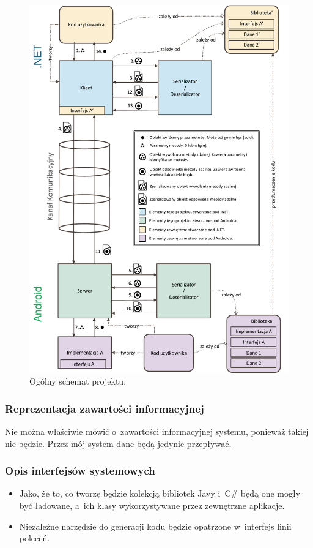\begin{figure}
	\centering
		\includegraphics[scale=0.8]{img/schematy/schemat-dzialania-magisterki.pdf}
	\caption{Ogólny schemat projektu.}
	\label{fig:project-overview}
\end{figure}


\subsubsection{Reprezentacja zawartości informacyjnej}
Nie można właściwie mówić o~zawartości informacyjnej systemu, ponieważ takiej nie będzie.
Przez mój system dane będą jedynie przepływać.


\subsubsection{Opis interfejsów systemowych}
\begin{itemize}
	\item Jako, że to, co tworzę będzie kolekcją bibliotek Javy i~C\# będą one mogły być ładowane, a~ich klasy wykorzystywane przez zewnętrzne aplikacje.
	\item Niezależne narzędzie do generacji kodu będzie opatrzone w~interfejs linii poleceń.
\end{itemize}


